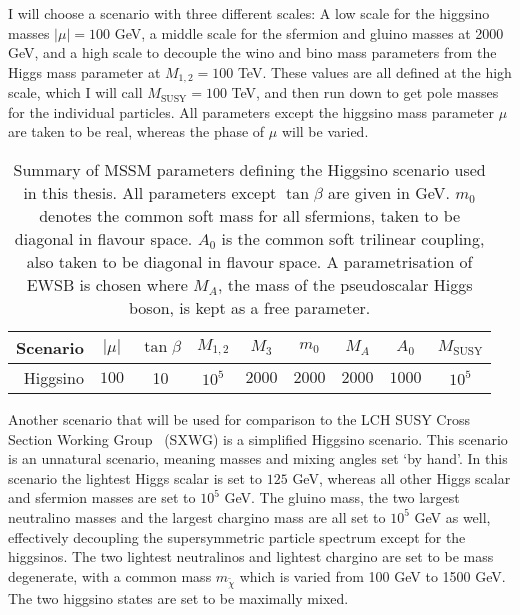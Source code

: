 \documentclass[../main.tex]{subfiles}
\begin{document}
I will choose a scenario with three different scales: A low scale for the higgsino masses \(|\mu| = 100\) GeV, a middle scale for the sfermion and gluino masses at 2000 GeV, and a high scale to decouple the wino and bino mass parameters from the Higgs mass parameter at \(M_{1,2} = 100\) TeV.
These values are all defined at the high scale, which I will call \(M_\text{SUSY} = 100\) TeV, and then run down to get pole masses for the individual particles.
All parameters except the higgsino mass parameter \(\mu\) are taken to be real, whereas the phase of \(\mu\) will be varied.
\medskip
{\renewcommand{\arraystretch}{1.2}
  \begin{table}[ht!]
    \centering
    \begin{tabular}{|r|c|c|c|c|c|c|c|c|}
      \hline
      \textbf{Scenario} & \(|\mu|\) & \(\tan\beta\) & \(M_{1,2}\) & \(M_3\)  & \(m_0\)  & \(M_A\)  & \(A_0\)  & \(M_\text{SUSY}\) \\
      \hline
      Higgsino          & \(100\)   & 10            & \(10^5\)    & \(2000\) & \(2000\) & \(2000\) & \(1000\) & \(10^5\)          \\
      \hline
    \end{tabular}
    \caption{Summary of MSSM parameters defining the Higgsino scenario used in this thesis.
      All parameters except \(\tan\beta\) are given in GeV.
      \(m_0\) denotes the common soft mass for all sfermions, taken to be diagonal in flavour space.
      \(A_0\) is the common soft trilinear coupling, also taken to be diagonal in flavour space.
      A parametrisation of EWSB is chosen where \(M_A\), the mass of the pseudoscalar Higgs boson, is kept as a free parameter.}
  \end{table}
}

Another scenario that will be used for comparison to the LCH SUSY Cross Section Working Group~\cite{SUSYxsecWG} (SXWG) is a simplified Higgsino scenario.
This scenario is an unnatural scenario, meaning masses and mixing angles set `by hand'.
In this scenario the lightest Higgs scalar is set to \(125\) GeV, whereas all other Higgs scalar and sfermion masses are set to \(10^5\) GeV.
The gluino mass, the two largest neutralino masses and the largest chargino mass are all set to \(10^5\) GeV as well, effectively decoupling the supersymmetric particle spectrum except for the higgsinos.
The two lightest neutralinos and lightest chargino are set to be mass degenerate, with a common mass \(m_{\tilde\chi}\) which is varied from 100 GeV to 1500 GeV.
The two higgsino states are set to be maximally mixed.
\end{document}
